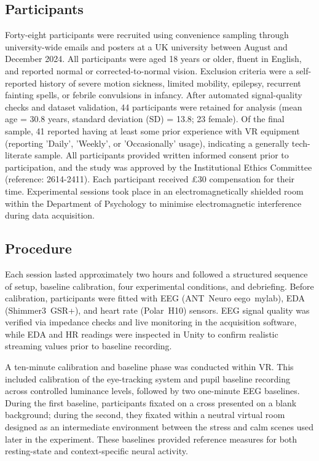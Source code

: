 \documentclass[lettersize,journal]{IEEEtran}
\begin{document}
\subsection{Participants}
\label{sec:participants}
Forty-eight participants were recruited using convenience sampling through university-wide emails and posters at a UK university between August and December 2024. 
All participants were aged 18 years or older, fluent in English, and reported normal or corrected-to-normal vision. 
Exclusion criteria were a self-reported history of severe motion sickness, limited mobility, epilepsy, recurrent fainting spells, or febrile convulsions in infancy. 
After automated signal-quality checks and dataset validation, 44 participants were retained for analysis (mean age = 30.8 years, standard deviation (SD) = 13.8; 23 female). 
Of the final sample, 41 reported having at least some prior experience with VR equipment (reporting 'Daily', 'Weekly', or 'Occasionally' usage), indicating a generally tech-literate sample.
All participants provided written informed consent prior to participation, and the study was approved by the Institutional Ethics Committee (reference: 2614-2411). 
Each participant received £30 compensation for their time. Experimental sessions took place in an electromagnetically shielded room within the Department of Psychology to minimise electromagnetic interference during data acquisition.

\subsection{Procedure}
Each session lasted approximately two hours and followed a structured sequence of setup, baseline calibration, four experimental conditions, and debriefing. Before calibration, participants were fitted with EEG (ANT~Neuro eego~mylab), EDA (Shimmer3~GSR+), and heart rate (Polar~H10) sensors. EEG signal quality was verified via impedance checks and live monitoring in the acquisition software, while EDA and HR readings were inspected in Unity to confirm realistic streaming values prior to baseline recording. 

A ten-minute calibration and baseline phase was conducted within VR. This included calibration of the eye-tracking system and pupil baseline recording across controlled luminance levels, followed by two one-minute EEG baselines. During the first baseline, participants fixated on a cross presented on a blank background; during the second, they fixated within a neutral virtual room designed as an intermediate environment between the stress and calm scenes used later in the experiment. These baselines provided reference measures for both resting-state and context-specific neural activity.
\end{document}
